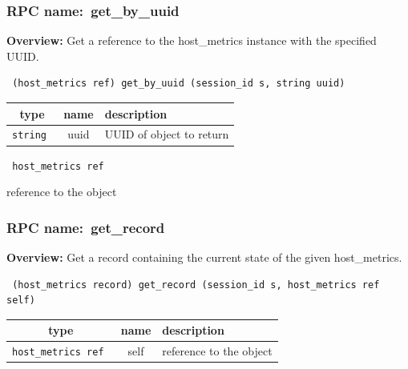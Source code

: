 \subsubsection{RPC name:~get\_by\_uuid}

{\bf Overview:} 
Get a reference to the host\_metrics instance with the specified UUID.

\begin{verbatim} (host_metrics ref) get_by_uuid (session_id s, string uuid)\end{verbatim}



 
\vspace{0.3cm}
\begin{tabular}{|c|c|p{7cm}|}
 \hline
{\bf type} & {\bf name} & {\bf description} \\ \hline
{\tt string } & uuid & UUID of object to return \\ \hline 

\end{tabular}

\vspace{0.3cm}

{\tt 
host\_metrics ref
}


reference to the object
\vspace{0.3cm}
\vspace{0.3cm}
\vspace{0.3cm}
\subsubsection{RPC name:~get\_record}

{\bf Overview:} 
Get a record containing the current state of the given host\_metrics.

\begin{verbatim} (host_metrics record) get_record (session_id s, host_metrics ref self)\end{verbatim}



 
\vspace{0.3cm}
\begin{tabular}{|c|c|p{7cm}|}
 \hline
{\bf type} & {\bf name} & {\bf description} \\ \hline
{\tt host\_metrics ref } & self & reference to the object \\ \hline 

\end{tabular}

